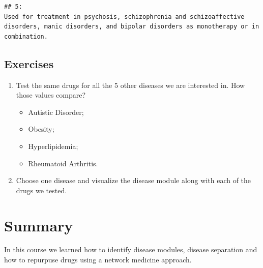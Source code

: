 \documentclass[
]{book}
\providecommand{\tightlist}{%
  \setlength{\itemsep}{0pt}\setlength{\parskip}{0pt}}
\begin{document}
\begin{verbatim}
## 5:                                                                                                                                                                                                                                                                                                                                                                                                                                                                                                                                                                                                                                                                                                                                                                                                                                                                                                                                                                                                                                                                                                                                                                                                                                                                                                                                                                                                                                                                                                                                                                                                                                                                      Used for treatment in psychosis, schizophrenia and schizoaffective disorders, manic disorders, and bipolar disorders as monotherapy or in combination.
\end{verbatim}

\hypertarget{exercises-5}{%
\section{Exercises}\label{exercises-5}}

\begin{enumerate}
\def\labelenumi{\arabic{enumi}.}
\item
  Test the same drugs for all the 5 other diseases we are interested in. How those values compare?

  \begin{itemize}
  \tightlist
  \item
    Autistic Disorder;
  \item
    Obesity;
  \item
    Hyperlipidemia;
  \item
    Rheumatoid Arthritis.
  \end{itemize}
\item
  Choose one disease and visualize the disease module along with each of the drugs we tested.
\end{enumerate}

\hypertarget{summary}{%
\chapter{Summary}\label{summary}}

In this course we learned how to identify disease modules, disease separation and how to repurpuse drugs using a network medicine approach.

  
\end{document}
